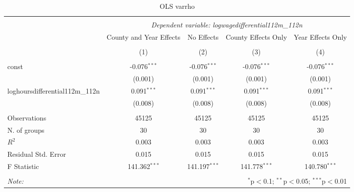 \documentclass{report}
\begin{document}
\begin{table}[!htbp] \centering
  \caption{OLS varrho }
\begin{tabular}{@{\extracolsep{5pt}}lcccc}
\\[-1.8ex]\hline
\hline \\[-1.8ex]
& \multicolumn{4}{c}{\textit{Dependent variable: logwagedifferential112m_112n}} \
\cr \cline{2-5}
\\[-1.8ex] & \multicolumn{1}{c}{County and Year Effects} & \multicolumn{1}{c}{No Effects} & \multicolumn{1}{c}{County Effects Only} & \multicolumn{1}{c}{Year Effects Only}  \\
\\[-1.8ex] & (1) & (2) & (3) & (4) \\
\hline \\[-1.8ex]
 const & -0.076$^{***}$ & -0.076$^{***}$ & -0.076$^{***}$ & -0.076$^{***}$ \\
& (0.001) & (0.001) & (0.001) & (0.001) \\
 loghoursdifferential112m_112n & 0.091$^{***}$ & 0.091$^{***}$ & 0.091$^{***}$ & 0.091$^{***}$ \\
& (0.008) & (0.008) & (0.008) & (0.008) \\
\hline \\[-1.8ex]
 Observations & 45125 & 45125 & 45125 & 45125 \\
 N. of groups & 30 & 30 & 30 & 30 \\
 $R^2$ & 0.003 & 0.003 & 0.003 & 0.003 \\
 Residual Std. Error & 0.015 & 0.015 & 0.015 & 0.015 \\
 F Statistic & 141.362$^{***}$ & 141.197$^{***}$ & 141.778$^{***}$ & 140.780$^{***}$ \\
\hline
\hline \\[-1.8ex]
\textit{Note:} & \multicolumn{4}{r}{$^{*}$p$<$0.1; $^{**}$p$<$0.05; $^{***}$p$<$0.01} \\
\end{tabular}
\end{table}
\end{document}
